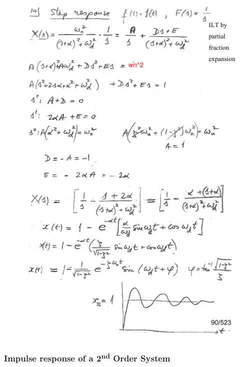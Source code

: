 \documentclass[12pt,letter]{article}
\begin{document}
\begin{mdframed}[middlelinewidth=0.5mm]
\begin{figure}[H]
	\includegraphics[width=5.5in]{../figures/x_t_time_response_2nd_order_step_proof_2}
\end{figure}
\end{mdframed}

\subsubsection{Impulse response of a 2\textsuperscript{nd} Order System}
\end{document}
